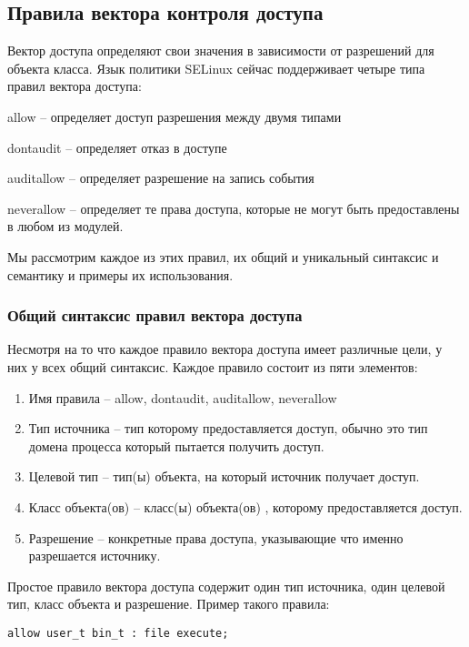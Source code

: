\documentclass{./../class/UIR}
\begin{document}
\subsection{Правила вектора контроля доступа}
    
    Вектор доступа определяют свои значения в зависимости от разрешений для
    объекта класса. Язык политики SELinux сейчас поддерживает четыре типа правил
    вектора доступа:

allow – определяет доступ разрешения между двумя типами

dontaudit – определяет отказ в доступе

auditallow – определяет разрешение на запись события

neverallow – определяет те права доступа, которые не могут  быть предоставлены в
любом из модулей.

 Мы рассмотрим каждое из этих правил, их общий и уникальный синтаксис и
 семантику и примеры их использования.

\subsubsection{Общий синтаксис правил вектора доступа}

Несмотря на то что каждое правило вектора доступа имеет различные цели, у них у
всех общий синтаксис. Каждое правило состоит из пяти элементов:

\begin{enumerate}
  \item Имя правила – allow, dontaudit, auditallow, neverallow
  \item Тип источника – тип которому предоставляется доступ, обычно это тип
  домена процесса который пытается получить доступ.
  \item Целевой тип – тип(ы) объекта, на который источник получает доступ.
  \item Класс объекта(ов) – класс(ы) объекта(ов) , которому предоставляется
  доступ.
  \item Разрешение – конкретные права доступа, указывающие что именно
  разрешается источнику.
\end{enumerate}
    
Простое правило вектора доступа содержит один тип источника, один целевой тип,
класс объекта и разрешение. Пример такого правила:

\begin{verbatim}
allow user_t bin_t : file execute;
\end{verbatim}
\end{document}
